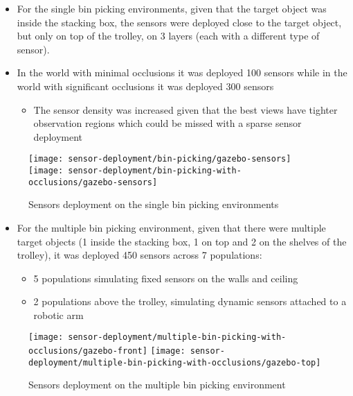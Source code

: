 \begin{itemize}
	\item For the single bin picking environments, given that the target object was inside the stacking box, the sensors were deployed close to the target object, but only on top of the trolley, on 3 layers (each with a different type of sensor).
	\item In the world with minimal occlusions it was deployed 100 sensors while in the world with significant occlusions it was deployed 300 sensors
	\begin{itemize}
		\item The sensor density was increased given that the best views have tighter observation regions which could be missed with a sparse sensor deployment
	\end{itemize}
\end{itemize}
\begin{figure}
	\centering
	\texttt{[image: sensor-deployment/bin-picking/gazebo-sensors]}\hspace{1em}
	\texttt{[image: sensor-deployment/bin-picking-with-occlusions/gazebo-sensors]}
	\caption{Sensors deployment on the single bin picking environments}
\end{figure}

\begin{itemize}
	\item For the multiple bin picking environment, given that there were multiple target objects (1 inside the stacking box, 1 on top and 2 on the shelves of the trolley), it was deployed 450 sensors across 7 populations:
	\begin{itemize}
		\item 5 populations simulating fixed sensors on the walls and ceiling
		\item 2 populations above the trolley, simulating dynamic sensors attached to a robotic arm
	\end{itemize}
\end{itemize}
\begin{figure}
	\centering
	\texttt{[image: sensor-deployment/multiple-bin-picking-with-occlusions/gazebo-front]}\hspace{1em}
	\texttt{[image: sensor-deployment/multiple-bin-picking-with-occlusions/gazebo-top]}
	\caption{Sensors deployment on the multiple bin picking environment}
\end{figure}
